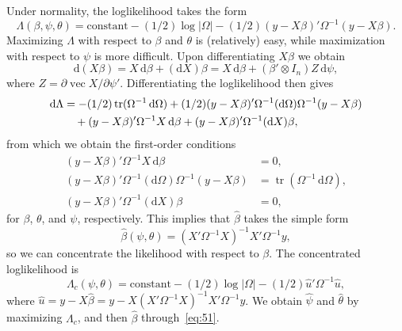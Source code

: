 \documentclass[12pt,a4paper]{article}
\theoremstyle{definition}
\DeclareMathOperator{\tr}{tr}
\DeclareMathOperator{\avec}{vec}
\newcommand{\dd}{\mathrm{d}}
\begin{document}
Under normality, the loglikelihood takes the form
\begin{equation}\label{eq:49}
\Lambda(\beta, \psi, \theta) = \text{constant} - (1/2)\log|\Omega|
- (1/2)(y - X\beta)'\Omega^{-1}(y - X\beta).
\end{equation}
Maximizing $\Lambda$ with respect to $\beta$ and $\theta$ is (relatively) easy, while maximization with respect to $\psi$ is more difficult. Upon differentiating $X\beta$ we obtain
\[
\dd(X\beta) = X\, \dd\beta + (\dd X)\beta = X\, \dd\beta + (\beta' \otimes I_n)Z\, \dd\psi,
\]
where $Z = \partial \avec X/\partial \psi'$. Differentiating the loglikelihood then gives
\begin{align}\label{eq:50}
\dd\Lambda &= -(1/2)\tr(\Omega^{-1}\, \dd\Omega) + (1/2)(y - X\beta)'\Omega^{-1}(\dd\Omega)\Omega^{-1}(y - X\beta) \notag \\
&\quad + (y - X\beta)'\Omega^{-1}X\, \dd\beta + (y - X\beta)'\Omega^{-1}(\dd X)\beta,
\end{align}
from which we obtain the first-order conditions
\begin{align*}
(y - X\beta)'\Omega^{-1}X\, \dd\beta &= 0, \\
(y - X\beta)'\Omega^{-1}(\dd\Omega)\Omega^{-1}(y - X\beta) &= \tr(\Omega^{-1}\, \dd\Omega), \\
(y - X\beta)'\Omega^{-1}(\dd X)\beta &= 0,
\end{align*}
for $\beta$, $\theta$, and $\psi$, respectively. %
This implies that $\hat{\beta}$ takes the simple form
\begin{equation}\label{eq:51}
\hat{\beta}(\psi, \theta) = (X'\Omega^{-1}X)^{-1}X'\Omega^{-1}y,
\end{equation}
so we can concentrate the likelihood with respect to $\beta$. The concentrated loglikelihood is
\[
\Lambda_c(\psi, \theta) = \text{constant} - (1/2)\log|\Omega| - (1/2)\hat{u}'\Omega^{-1}\hat{u},
\]
where $\hat{u} = y - X\hat{\beta} = y - X(X'\Omega^{-1}X)^{-1}X'\Omega^{-1}y$. We obtain $\hat{\psi}$ and $\hat{\theta}$ by maximizing $\Lambda_c$, and then $\hat{\beta}$ through~\eqref{eq:51}. %
\end{document}
